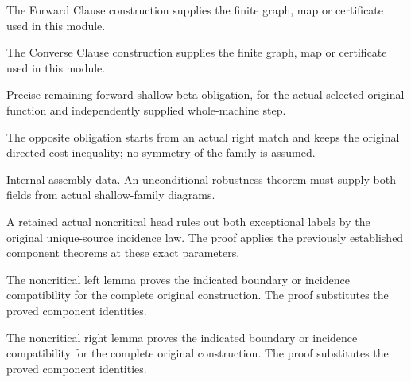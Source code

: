 The Forward Clause construction supplies the finite graph, map or certificate used in this module.
\par{}

The Converse Clause construction supplies the finite graph, map or certificate used in this module.
\par{}

Precise remaining forward shallow-beta obligation, for the actual
selected original function and independently supplied whole-machine step.
\par{}

The opposite obligation starts from an actual right match and keeps the
original directed cost inequality; no symmetry of the family is assumed.
\par{}

Internal assembly data. An unconditional robustness theorem must supply
both fields from actual shallow-family diagrams.
\par{}

A retained actual noncritical head rules out both exceptional labels by
the original unique-source incidence law.
The proof applies the previously established component theorems at these exact parameters.
\par{}

The noncritical left lemma proves the indicated boundary or incidence compatibility for the complete original construction.
The proof substitutes the proved component identities.
\par{}

The noncritical right lemma proves the indicated boundary or incidence compatibility for the complete original construction.
The proof substitutes the proved component identities.
\par{}

